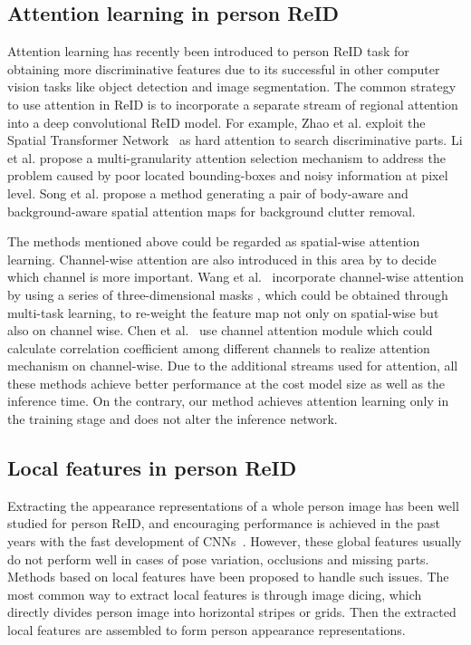 \documentclass[10pt,twocolumn,letterpaper]{article}
\begin{document}
\subsection{Attention learning in person ReID}  Attention learning has recently been introduced to person ReID task\cite{zhao2017deeply,li2018harmonious,song2018mask,tay2019aanet,si2018dual} for obtaining more discriminative features due to its successful in other computer vision tasks like object detection\cite{chen2017sca} and image segmentation\cite{chen2016attention,fu2019dual}. The common strategy to use attention in ReID is to incorporate a separate stream of regional attention into a deep convolutional ReID model. For example, Zhao et al.\cite{zhao2017deeply} exploit the Spatial Transformer Network~\cite{jaderberg2015spatial} as hard attention to search discriminative parts. Li et al. \cite{li2018harmonious} propose a multi-granularity attention selection mechanism to address the problem caused by poor located bounding-boxes and noisy information at pixel level. Song et al. \cite{song2018mask} propose a method generating a pair of body-aware and background-aware spatial attention maps for background clutter removal. 

The methods mentioned above could be regarded as spatial-wise attention learning. Channel-wise attention are also introduced in this area by \cite{wang2018mancs, chen2019abd, chen2019self}  to decide which channel is more important. Wang et al.~\cite{wang2018mancs} incorporate channel-wise attention by using a series of three-dimensional masks , which could be obtained through multi-task learning, to re-weight the feature map not only on spatial-wise but also on channel wise. Chen et al.~\cite{chen2019abd} use channel attention module which could calculate correlation coefficient among different channels to realize attention mechanism on channel-wise. Due to the additional streams used for attention, all these methods achieve better performance at the cost model size as well as the inference time. On the contrary, our method achieves attention learning only in the training stage and does not alter the inference network.


\subsection{Local features in person ReID} 

Extracting the appearance representations of a whole person image has been well studied for person ReID, and encouraging performance is achieved in the past years with the fast development of CNNs~\cite{zheng2016person,sun2017svdnet,hermans2017defense,zhong2018camera}. However, these global features usually do not perform well in cases of pose variation, occlusions and missing parts. Methods based on local features have been proposed to handle such issues. The most common way to extract local features is through image dicing, which directly divides person image into horizontal stripes\cite{yi2014deep,cheng2016person,sun2018beyond} or grids\cite{li2014deepreid, ahmed2015improved}. Then the extracted local features are assembled to form person appearance representations.
\end{document}
